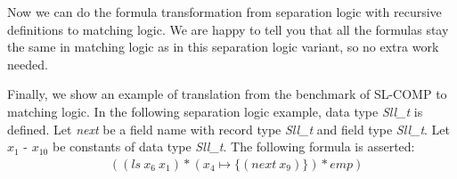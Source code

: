 \documentclass{article}
\theoremstyle{plain}
\begin{document}
Now we can do the formula transformation from separation logic with recursive definitions to matching logic. We are happy to tell you that all the formulas stay the same in matching logic as in this separation logic variant, so no extra work needed.
\begin{comment}
\begin{algorithm}
	\KwIn{a separation logic pattern $P$}
	\KwOut{a matching logic formula}
    \Switch{the pattern $P$}{
      \uCase{$\Pi$}
            {\Return{$\Pi$} \;}
      \uCase{$junk$}
            {\Return{$true$} \;}
      \uCase{$\Sigma$}
            {\Return{$\Sigma$} \;}
      \uCase{$\exists x . Q$}
            {\Return{$\exists x . Q$} \;}
      \uCase{$\Pi \wedge \mathtt{tobool}(\Sigma) \wedge \Delta$}
            {\Return{$\Pi \wedge \Sigma \wedge \Delta$ \;}}
    }
	\caption{The separation logic to matching logic  transformation}
\end{algorithm}
\end{comment}

Finally, we show an example of translation from the benchmark of SL-COMP to matching logic. 
In the following separation logic example, data type \textit{Sll\_t} is defined. 
Let \textit{next} be a field name with record type \textit{Sll\_t} and field type \textit{Sll\_t}. Let $x_1$ - $x_{10}$ be constants of data type \textit{Sll\_t}. The following formula is asserted:
\begin{equation*}
\begin{split}
&((\mathit{ls}\ x_6\ x_1) *(x_4\mapsto \{(\mathit{next}\ x_9)\}) *\mathit{emp})
\end{split}
\end{equation*}
\end{document}
